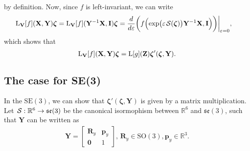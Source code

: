 by definition. Now, since $f$ is left-invariant, we can write
\begin{align}
    \Lop_\mathbf{V}[f](\mathbf{X}, \mathbf{Y})\boldsymbol{\zeta} &= 
    \Lop_\mathbf{V}[f](\mathbf{Y}^{-1}\mathbf{X}, \mathbf{I})\boldsymbol{\zeta}
    = \frac{d}{d\varepsilon}\biggl(f\Bigl(\exp\bigl(\varepsilon\SL[\boldsymbol{\zeta}]\bigr)\mathbf{Y}^{-1}\mathbf{X}, \mathbf{I}\Bigr)\biggr)\biggr|_{\varepsilon=0},
\end{align}
which shows that
\begin{align}
    \operatorname{L}_\mathbf{V}[f](\mathbf{X}, \mathbf{Y})\boldsymbol{\zeta} = \operatorname{L}[g](\mathbf{Z})\boldsymbol{\zeta}'(\boldsymbol{\zeta}, \mathbf{Y}) \label{app:prop-Lop-chain-rule-LVf-final-form}.
\end{align}
\subsection{The case for SE(3)}\label{app:prop-Lop-chain-rule-SE3}
In the $\text{SE}(3)$, we can show that $\boldsymbol{\zeta}'(\boldsymbol{\zeta}, \mathbf{Y})$ is given by a matrix multiplication. Let $\SL:\mathbb{R}^6\to\mathfrak{se}(3)$ be the canonical isormophism between $\mathbb{R}^6$ and $\mathfrak{se}(3)$, such that $\mathbf{Y}$ can be written as
\begin{align}
    \mathbf{Y} = \begin{bmatrix}
        \mathbf{R}_y & \mathbf{p}_y\\
        \mathbf{0} & 1
    \end{bmatrix},\,\mathbf{R}_y\in\text{SO}(3), \mathbf{p}_y\in\mathbb{R}^3.
\end{align}

